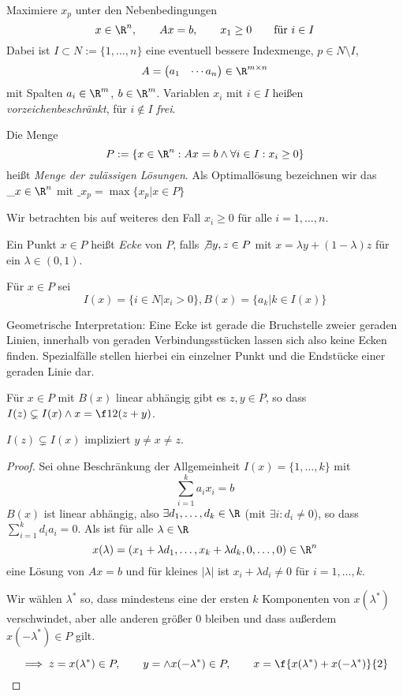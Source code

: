 \documentclass[a4paper]{scrartcl}
\numberwithin{equation}{section}
\begin{document}
\begin{df}
	\label{df:5.3}
	Maximiere $x_p$ unter den Nebenbedingungen
	\begin{equation}
		\label{eq:6.7}
		x\in \R^n, \qquad Ax=b, \qquad x_1 \ge 0  \qquad \text{für } i\in I
	\end{equation}
	Dabei ist $I\subset N:=\{1,\dotsc,n\}$ eine eventuell bessere Indexmenge, $p\in N\setminus I$,
	\[
		A = \begin{pmatrix}a_1 & \cdots a_n\end{pmatrix} \in \R^{m\times n}
	\]
	mit Spalten $a_i\in \R^m$, $b\in \R^m$.
	Variablen $x_i$ mit $i\in I$ heißen \emph{vorzeichenbeschränkt}, für $i\not\in I$ \emph{frei}.

	Die Menge
	\[
		P := \{ x\in\R^n : Ax=b \land \forall i\in I: x_i \ge 0 \}
	\]
	heißt \emph{Menge der zulässigen Lösungen}.
	Als Optimallösung bezeichnen wir das $\_x\in \R^n$ mit $\_x_p = \max\{x_p|x\in P\}$
\end{df}

Wir betrachten bis auf weiteres den Fall $x_i\ge 0$ für alle $i=1,\dotsc, n$.
\begin{df}[Ecke]
	Ein Punkt $x\in P$ heißt \emph{Ecke} von $P$, falls $\not\exists y,z\in P$ mit $x=\lambda y + (1-\lambda) z$ für ein $\lambda \in (0,1)$.

Für $x\in P$ sei
\[
	I(x) = \{i\in N\big| x_i > 0\}, B(x) = \{a_k | k\in I(x)\}
\]
\end{df}
\begin{note}
Geometrische Interpretation:  Eine Ecke ist gerade die Bruchstelle zweier geraden Linien, innerhalb von geraden Verbindungsstücken lassen sich also keine Ecken finden. Spezialfälle stellen hierbei ein einzelner Punkt und die Endstücke einer geraden Linie dar.  
\end{note}
\begin{lem}
	\label{lem:5.5}
	Für $x\in P$ mit $B(x)$ linear abhängig gibt es $z,y\in P$, so dass $I(z)\subsetneq I(x) \land x=\f12(z+y)$.
	\begin{note}
		$I(z)\subsetneq I(x)$ impliziert $y\neq x \neq z$.
	\end{note}
	\begin{proof}
		Sei ohne Beschränkung der Allgemeinheit $I(x)=\{1,\dotsc, k\}$ mit
		\[
			\sum_{i=1}^k a_ix_i = b
		\]
		$B(x)$ ist linear abhängig, also $\exists d_1,\dotsc,d_k\in \R$ (mit $\exists i:d_i\neq 0$), so dass $\sum_{i=1}^kd_ia_i=0$.
		Als ist für alle $\lambda \in \R$
		\[
			x(\lambda) = (x_1 + \lambda d_1, \dotsc, x_k + \lambda d_k, 0, \dotsc, 0) \in \R^n
		\]
		eine Lösung von $Ax=b$ und für kleines $|\lambda|$ ist $x_i + \lambda d_i \neq 0$ für $i=1,\dotsc,k$.

		Wir wählen $\lambda^*$ so, dass mindestens eine der ersten $k$ Komponenten von $x(\lambda^*)$ verschwindet, aber alle anderen größer $0$ bleiben und dass außerdem $x(-\lambda^*) \in P$ gilt.

		\[
			\implies z=x(\lambda^*) \in P, \qquad y=\land x(-\lambda^*) \in P,  \qquad x=\f{x(\lambda^*) + x(-\lambda^*)}{2}
		\]
	\end{proof}
\end{lem}
\end{document}
